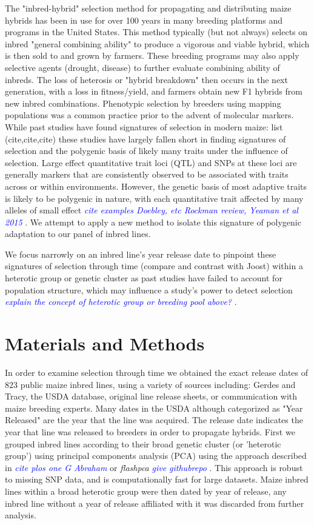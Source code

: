 \documentclass[9pt,twocolumn,twoside]{gsajnl}
\newcommand{\kc}[1]{\textcolor{blue}{ \emph{ #1}} }
\begin{document}
The "inbred-hybrid" selection method for propagating and distributing maize hybrids has been in use for over 100 years in many breeding platforms and programs in the United States. 
This method typically (but not always) selects on inbred "general combining ability" to produce a vigorous and viable hybrid, which is then sold to and grown by farmers. 
These breeding programs may also apply selective agents (drought, disease) to further evaluate combining ability of inbreds.
The loss of heterosis or "hybrid breakdown" then occurs in the next generation, with a loss in fitness/yield, and farmers obtain new F1 hybrids from new inbred combinations.
Phenotypic selection by breeders using mapping populations was a common practice prior to the advent of molecular markers. 
While past studies have found signatures of selection in modern maize: list (cite,cite,cite) these studies have largely fallen short in finding signatures of selection and the polygenic basis of likely many traits under the influence of selection. 
Large effect quantitative trait loci (QTL) and SNPs at these loci are generally markers that are consistently observed to be associated with traits across or within environments. 
However, the genetic basis of most adaptive traits is likely to be polygenic in nature, with each quantitative trait affected by many alleles of small effect \kc{cite examples Doebley, etc Rockman review, Yeaman et al 2015}. We attempt to apply a new method to isolate this signature of polygenic adaptation to our panel of inbred lines.

We focus narrowly on an inbred line's year release date to pinpoint these signatures of selection through time (compare and contrast with Joost) within a heterotic group or genetic cluster as past studies have failed to account for population structure, which may influence a study's power to detect selection \kc{explain the concept of heterotic group or breeding pool above?}. 



\section*{Materials and Methods}

In order to examine selection through time we obtained the exact release dates of 823 public maize inbred lines, using a variety of sources including: Gerdes and Tracy, the USDA database, original line release sheets, or communication with maize breeding experts. Many dates in the USDA although categorized as "Year Released" are the year that the line was acquired. 
The release date indicates the year that line was released to breeders in order to propagate hybrids.
First we grouped inbred lines according to their broad genetic cluster (or 'heterotic group') using principal components analysis (PCA) using the approach described in  \kc{cite plos one G Abraham} or \textit{flashpca} \kc{give githubrepo}. 
This approach is robust to missing SNP data, and is computationally fast for large datasets.  
Maize inbred lines within a broad heterotic group were then dated by year of release, any inbred line without a year of release affiliated with it was discarded from further analysis.
\end{document}
